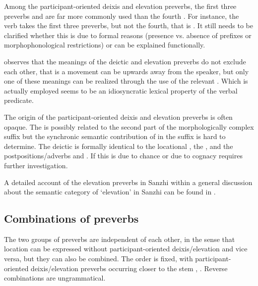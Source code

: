 Among the participant-oriented deixis and elevation preverbs, the first three preverbs  and  are far more commonly used than the fourth  . For instance, the verb  takes the first three preverbs, but not the fourth, that is . It still needs to be clarified whether this is due to formal reasons (presence vs. absence of  prefixes or morphophonological restrictions) or can be explained functionally. 

\citet{Tatevosov2000} observes that the meanings of the deictic and elevation preverbs do not exclude each other, that is a movement can be upwards away from the speaker, but only one of these meanings can be realized through the use of the relevant . Which  is actually employed seems to be an idiosyncratic lexical property of the verbal predicate.

The origin of the participant-oriented deixis and elevation preverbs is often opaque. The   is possibly related to the second part of the morphologically complex  suffix  but the synchronic semantic contribution of  in the  suffix is hard to determine. The deictic    is formally identical to the locational   , the   , and the postpositions/adverbs   and  . If this is due to chance or due to cognacy requires further investigation.

A detailed account of the elevation preverbs in Sanzhi within a general discussion about the semantic category of `elevation' in Sanzhi can be found in \citet{ForkerLTSanzhi}.


\subsection{Combinations of preverbs}
\label{ssec:Combinations of preverbs}

The two groups of preverbs are independent of each other, in the sense that location can be expressed without participant-oriented deixis/elevation and vice versa, but they can also be combined. The order is fixed, with participant-oriented deixis/elevation preverbs occurring closer to the stem , . Reverse combinations are ungrammatical.

